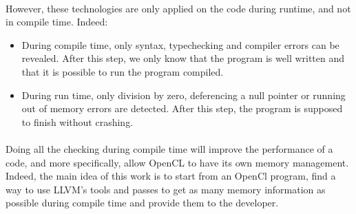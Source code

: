 \documentclass{article}
\begin{document}
\paragraph{}
However, these technologies are only applied on the code during runtime, and not in compile time. Indeed:
\begin{itemize}
\item During compile time, only syntax, typechecking and compiler errors can be revealed. After this step, we only know that the program is well written and that it is possible to run the program compiled.
\item During run time, only division by zero, deferencing a null pointer or running out of memory errors are detected. After this step, the program is supposed to finish without crashing. 
\end{itemize}

\paragraph{}
Doing all the checking during compile time will improve the performance of a code, and more specifically, allow OpenCL to have its own memory management. Indeed, the main idea of this work is to start from an OpenCl program, find a way to use LLVM's tools and passes to get as many memory information as possible during compile time and provide them to the developer. 
\end{document}

